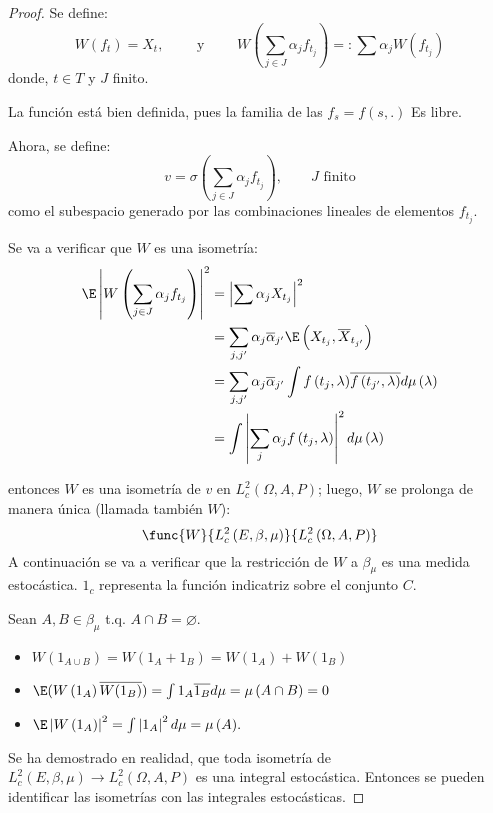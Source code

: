 \begin{proof}
 
Se define:
\[
W\left( f_{t} \right)=X_{t},\qquad \text{ y }\qquad W\left( \sum_{j\in J}{\alpha_{j}f_{t_{j}}} \right)=:\sum {\alpha_{j}W\left( f_{t_{j}} \right)} 
\]
donde, $t\in T$ y $J$ finito. 

La funci\'{o}n est\'{a} bien definida, pues la familia de las $f_{s}=f\left(s,. \right)$ Es libre.

Ahora, se define: 
\[
v=\sigma \left( \sum_{j\in J} {\alpha_{j}f_{t_{j}}} 
\right),\qquad J\text{ finito}
\]
como el subespacio generado por las combinaciones lineales de elementos $f_{t_{j}}$.\newline

Se va a verificar que $W$ es una isometr\'{i}a:
\begin{align*}
 \E\left| W\left( \sum_{j\in J} {\alpha_{j}f_{t_{j}}} \right) \right|^{2}
	&= \left| \sum {\alpha_{j}X_{t_{j}}} \right|^{2}\\
	&=\sum_{j,j'} {\alpha_{j}\overline{\alpha }_{j'}} \E\left( X_{t_{j}},\overline{X}_{t_{j'}} \right)\\
	&=\sum_{j,j'} {\alpha_{j}\overline{\alpha }_{j'}} \int {f\left(t_{j},\lambda \right)} \overline{f\left( t_{j'},\lambda \right)}d\mu \left( \lambda \right)\\
	&=\int {\left| \sum_j {\alpha_{j}f\left( t_{j},\lambda \right)} \right|^{2}d\mu \left( \lambda \right)} 
\end{align*}

entonces $W$ es una isometr\'{i}a de $v$ en $L_{c}^{2}\left(\Omega,A,P \right)$; luego, $W$ se prolonga de manera \'{u}nica (llamada tambi\'{e}n $W$):
\[
\func{W}{L_{c}^{2}\left( E,\beta ,\mu \right)}{L_{c}^{2}\left(\Omega,A,P \right)}
\]
A continuaci\'{o}n se va a verificar que la restricci\'{o}n de $W$ a $\beta_{\mu }$ es una medida estoc\'{a}stica. $1_{c}$ representa la funci\'{o}n indicatriz sobre el conjunto $C$.

Sean $A, B\in \beta_{\mu }$ t.q. $A\cap B=\varnothing$.
\begin{itemize}
\item $W\left( {1_{A\cup B} } \right)=W\left( {1_{A} +1_{B} } \right)=W\left( {1_{A} } \right)+W\left( {1_{B} } \right)$
\item $\E(W\left( {1_{A} } \right)\overline {W(1_{B} )} )=\int {1_{A} \overline {1_{B} } d\mu =\mu \left( {A\cap B} \right)=0} $
\item $\E\left| {W\left( {1_{A} } \right)} \right|^{2}=\int 
{\left| {1_{A} } \right|^{2}d\mu =\mu \left( A \right)} .$
\end{itemize}

Se ha demostrado en realidad, que toda isometr\'{i}a de $L_{c}^{2}\left( E,\beta ,\mu \right)\to L_{c}^{2}\left( \Omega ,A,P \right)$ es una integral estoc\'{a}stica. Entonces se pueden identificar las isometr\'{i}as con las integrales estoc\'{a}sticas.
\end{proof}

